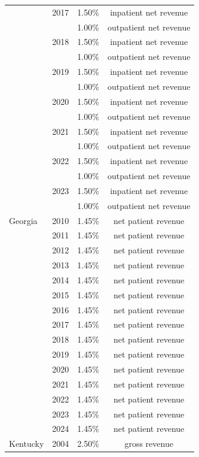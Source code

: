 \begin{longtable}{llcc}
 & 2017 & 1.50\% & inpatient net revenue \\[0pt]
 &  & 1.00\% & outpatient net revenue \\[0pt]
 & 2018 & 1.50\% & inpatient net revenue \\[0pt]
 &  & 1.00\% & outpatient net revenue \\[0pt]
 & 2019 & 1.50\% & inpatient net revenue \\[0pt]
 &  & 1.00\% & outpatient net revenue \\[0pt]
 & 2020 & 1.50\% & inpatient net revenue \\[0pt]
 &  & 1.00\% & outpatient net revenue \\[0pt]
 & 2021 & 1.50\% & inpatient net revenue \\[0pt]
 &  & 1.00\% & outpatient net revenue \\[0pt]
 & 2022 & 1.50\% & inpatient net revenue \\[0pt]
 &  & 1.00\% & outpatient net revenue \\[0pt]
 & 2023 & 1.50\% & inpatient net revenue \\[0pt]
 &  & 1.00\% & outpatient net revenue \\[0pt]
\midrule
Georgia & 2010 & 1.45\% & net patient revenue \\[0pt]
 & 2011 & 1.45\% & net patient revenue \\[0pt]
 & 2012 & 1.45\% & net patient revenue \\[0pt]
 & 2013 & 1.45\% & net patient revenue \\[0pt]
 & 2014 & 1.45\% & net patient revenue \\[0pt]
 & 2015 & 1.45\% & net patient revenue \\[0pt]
 & 2016 & 1.45\% & net patient revenue \\[0pt]
 & 2017 & 1.45\% & net patient revenue \\[0pt]
 & 2018 & 1.45\% & net patient revenue \\[0pt]
 & 2019 & 1.45\% & net patient revenue \\[0pt]
 & 2020 & 1.45\% & net patient revenue \\[0pt]
 & 2021 & 1.45\% & net patient revenue \\[0pt]
 & 2022 & 1.45\% & net patient revenue \\[0pt]
 & 2023 & 1.45\% & net patient revenue \\[0pt]
 & 2024 & 1.45\% & net patient revenue \\[0pt]
\midrule
Kentucky & 2004 & 2.50\% & gross revenue \\[0pt]

\end{longtable}
